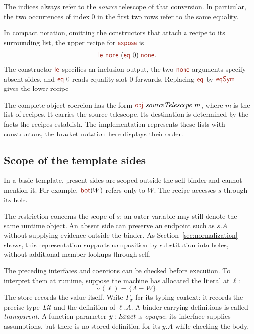 The indices always refer to the \emph{source} telescope of that conversion.
In particular, the two occurrences of index 0 in the first two rows
refer to the same equality.

In compact notation, omitting the constructors that attach a recipe to
its surrounding list, the upper recipe for $\ev{expose}$ is
\[
 \ev{le}\ \ev{none}\ (\ev{eq}\ 0)\ \ev{none}.
\]
The constructor $\ev{le}$ specifies an inclusion output, the two
$\ev{none}$ arguments specify absent sides, and $\ev{eq}\ 0$ reads
equality slot 0 forwards. Replacing $\ev{eq}$ by $\ev{eqSym}$ gives the
lower recipe.

The complete object coercion has the form
$\ev{obj}\ \ty{sourceTelescope}\ m$, where $m$ is the list of recipes.
It carries the source telescope. Its destination is determined by the
facts the recipes establish. The implementation represents these lists
with constructors; the bracket notation here displays their order.

\subsection*{Scope of the template sides}
In a basic template, present sides are scoped outside the self binder
and cannot mention it. For example, $\ev{bot}(W)$ refers only to $W$.
The recipe accesses $s$ through its hole.

The restriction concerns the scope of $s$; an outer variable may still
denote the same runtime object. An absent side can preserve an endpoint
such as $s.A$ without supplying evidence outside the binder.
As Section~\ref{sec:normalization} shows, this representation supports
composition by substitution into holes, without additional member
lookups through self.


\label{sec:store}

The preceding interfaces and coercions can be checked before execution.
To interpret them at runtime, suppose the machine has allocated the
literal at $\ell$:
\[
 \sigma(\ell)=\{A=W\}.
\]
The store records the value itself. Write $\Gamma_\sigma$ for its typing
context: it records the precise type $\mathit{Lit}$ and the definition of
$\ell.A$. A binder carrying definitions is called \emph{transparent}.
A function parameter
$y:\mathit{Exact}$ is \emph{opaque}: its interface supplies assumptions, but
there is no stored definition for its $y.A$ while checking the body.

